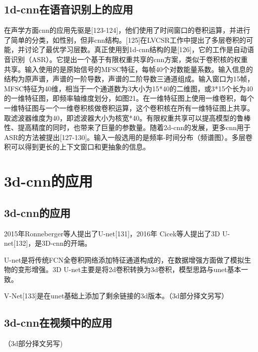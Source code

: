 \documentclass[15pt]{article}
\begin{document}
\subsection{1d-cnn在语音识别上的应用}
在声学方面cnn的应用先驱是[123-124]，他们使用了时间窗口的卷积运算，并进行了简单的分类，如性别，但非cnn结构。[125]在LVCSR工作中提出了多层卷积的可能，并讨论了最优学习层数。真正使用到1d-cnn结构的是[126]，它的工作是自动语音识别（ASR）。它提出一个基于有限权重共享的cnn方案，类似于卷积核的权重共享。输入使用的是原始信号的MFSC特征，每帧40个对数能量系数。输入信息的结构为原声谱，声谱的一阶导数，声谱的二阶导数三通道组成。输入窗口为15帧，MFSC特征为40维，相当于一个通道数为3大小为15*40的二维图，或3*15个长为40的一维特征图，即频率轴维度划分，如图21。在一维特征图上使用一维卷积，每个一维特征图与一个一维卷积核做卷积运算，这个卷积核在所有一维特征图上共享。取滤波器维度为40，即滤波器大小为核宽*40。有限权重共享可以提高模型的鲁棒性、提高精度的同时，也带来了巨量的参数量。随着2d-cnn的发展，更多cnn用于ASR的方法被提出[127-130]。输入一般选用的是频率-时间分布（频谱图）。多层卷积可以得到更长的上下文窗口和更抽象的信息。

\section{3d-cnn的应用}
\subsection{3d-cnn的应用}
2015年Ronneberger等人提出了U-net[131]，2016年 Cicek等人提出了3D U-net[132]，是3D-cnn的开端。

U-net是将传统FCN全卷积网络添加特征通道构成的，在数据增强方面做了模拟生物的变形增强。3D U-net主要是将2d卷积转换为3d卷积，模型思路与unet基本一致。

V-Net[133]是在unet基础上添加了剩余链接的3d版本。（3d部分择文另写）

\subsection{3d-cnn在视频中的应用}
（3d部分择文另写)
\end{document}
